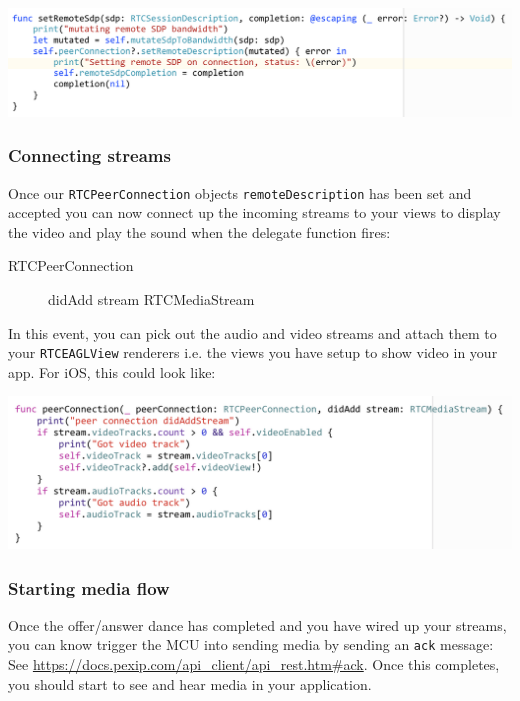 \documentclass[a4paper,11pt]{article}
\begin{document}
\begin{center}
\includegraphics[width=.9\linewidth]{./images/remote_sdp.png}
\end{center}

\subsubsection{Connecting streams}
\label{sec:org7eab4e2}

Once our \texttt{RTCPeerConnection} objects \texttt{remoteDescription} has been set
and accepted you can now connect up the incoming streams to your views
to display the video and play the sound when the delegate function fires:

\begin{description}
\item[{RTCPeerConnection}] didAdd stream RTCMediaStream
\end{description}

In this event, you can pick out the audio and video streams and attach
them to your \texttt{RTCEAGLView} renderers i.e. the views you have setup to
show video in your app.  For iOS, this could look like:

\begin{center}
\includegraphics[width=.9\linewidth]{./images/add_stream.png}
\end{center}

\subsubsection{Starting media flow}
\label{sec:orga154fee}

Once the offer/answer dance has completed and you have wired up your
streams, you can know trigger the MCU into sending media by sending an
\texttt{ack} message: See \url{https://docs.pexip.com/api\_client/api\_rest.htm\#ack}.
Once this completes, you should start to see and hear media in your
application.
\end{document}

